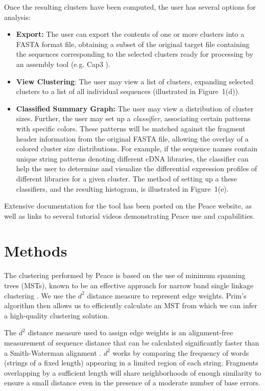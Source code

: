 \documentclass[a4,center,fleqn]{NAR}
\begin{document}
 Once the resulting clusters have been
computed, the user has several options
for analysis:
\begin{itemize}
\item {\bf Export:} The user can export the contents of one or more
  clusters into a FASTA format file, obtaining a subset of the original target file
  containing the sequences corresponding to the selected clusters
  ready for processing by an assembly tool (e.g. {\sc Cap3} \cite{Huang99}).
\item {\bf View Clustering}: The user may view a list of clusters,
  expanding selected clusters to a list of all individual sequences (illustrated
  in Figure~1(d)).
\item {\bf Classified Summary Graph:} The user may view a distribution
  of cluster sizes.  Further, the user may set up a {\it classifier},
  associating certain patterns with specific colors.  These patterns
  will be matched against the fragment header information from the
  original FASTA file, allowing the overlay of a colored cluster size
  distributions.  For example, if the sequence names contain unique
  string patterns denoting different cDNA libraries, the classifier
  can help the user to determine and visualize the differential expression profiles
  of different libraries for a given cluster.  The method of setting up a these classifiers, and the
  resulting histogram, is illustrated in Figure~1(e).
\end{itemize}
Extensive documentation for the tool has been posted on the {\sc
  Peace} website, as well as links to several tutorial videos demonstrating
{\sc Peace} use and capabilities.


\section{Methods}

The clustering performed by {\sc Peace} is based on the use of minimum
spanning trees (MSTs), known to be an effective approach for narrow
band single linkage clustering \cite{Jain99,Wan08}. We use the $d^2$
distance measure \cite{Hide94} to represent edge weights.  Prim's
algorithm \cite{Prim57} then allows us to efficiently calculate an
MST from which we can infer a high-quality clustering solution.

The $d^2$ distance measure used to assign edge weights is an
alignment-free measurement of sequence distance that can be calculated
significantly faster than a Smith-Waterman alignment \cite{Hide94}.
$d^2$ works by comparing the frequency of words (strings of a fixed
length) appearing in a limited region of each string.  Fragments
overlapping by a sufficient length will share neighborhoods of enough
similarity to ensure a small distance even in the presence of a
moderate number of base errors.
\end{document}
